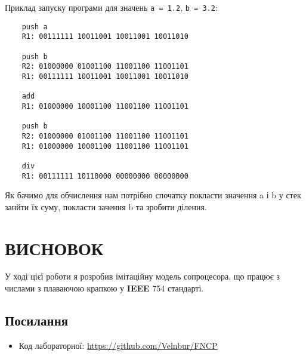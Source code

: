 \documentclass[a4paper,12pt]{report}
\begin{document}
Приклад запуску програми для значень \verb|a = 1.2|, \verb|b = 3.2|:
\begin{verbatim}
    push a
    R1: 00111111 10011001 10011001 10011010

    push b
    R2: 01000000 01001100 11001100 11001101
    R1: 00111111 10011001 10011001 10011010

    add
    R1: 01000000 10001100 11001100 11001101

    push b
    R2: 01000000 01001100 11001100 11001101
    R1: 01000000 10001100 11001100 11001101

    div
    R1: 00111111 10110000 00000000 00000000
\end{verbatim}

Як бачимо для обчислення нам потрібно спочатку покласти значення a і b у стек
занйти їх суму, покласти зачення b та зробити ділення.

\section{ВИСНОВОК}
У ході цієї роботи я розробив імітаційну модель сопроцесора, що працює з числами
з плаваючою крапкою у \textbf{IEEE} 754 стандарті.

\subsection{Посилання}
\begin{itemize}
    \item{Код лабораторної: \url{https://github.com/Velnbur/FNCP}}
\end{itemize}
\end{document}
